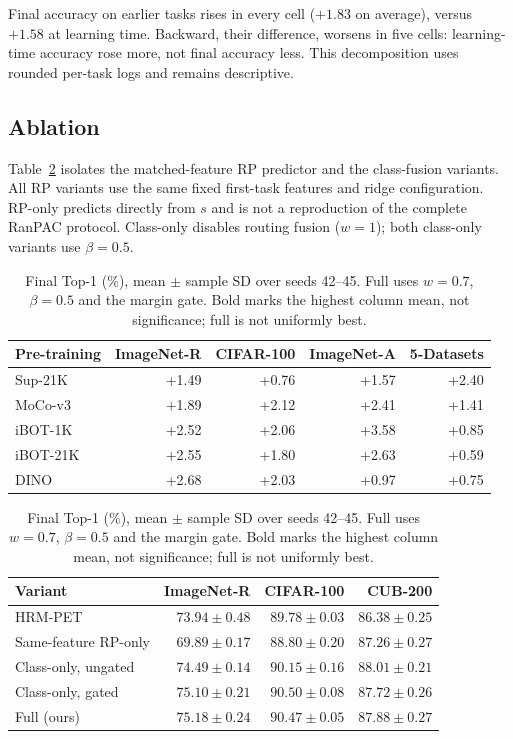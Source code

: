 \documentclass[runningheads]{llncs}
\begin{document}
Final accuracy on earlier tasks rises in every cell ($+1.83$ on
average), versus $+1.58$ at learning time. Backward, their difference, worsens
in five cells: learning-time accuracy rose more, not final accuracy less.
This decomposition uses rounded per-task logs and remains descriptive.

\subsection{Ablation}
\label{sec:ablation}

\noindent\begin{minipage}{\linewidth}
Table~\ref{tab:components} isolates the matched-feature RP predictor and the
class-fusion variants. All RP variants use the same fixed first-task features
and ridge configuration. RP-only predicts directly from $s$ and is not a
reproduction of the complete RanPAC protocol. Class-only disables routing
fusion ($w=1$); both class-only variants use $\beta=0.5$.
\end{minipage}
\par\medskip

\begin{table}[!ht]
\centering
\small
\setlength{\tabcolsep}{6pt}
\caption{Top-1 change (points), full minus matched HRM-PET at seed $42$.
All cells use $w=0.7$, $\beta=0.5$ and the margin gate; no confidence
intervals are implied.}
\label{tab:grid}
\begin{tabular}{lrrrr}
\toprule
Pre-training & ImageNet-R & CIFAR-100 & ImageNet-A & 5-Datasets\\
\midrule
Sup-21K   & +1.49 & +0.76 & +1.57 & +2.40\\
MoCo-v3   & +1.89 & +2.12 & +2.41 & +1.41\\
iBOT-1K   & +2.52 & +2.06 & +3.58 & +0.85\\
iBOT-21K  & +2.55 & +1.80 & +2.63 & +0.59\\
DINO      & +2.68 & +2.03 & +0.97 & +0.75\\
\bottomrule
\end{tabular}

\vspace{.35\baselineskip}
\setlength{\tabcolsep}{5pt}
\caption{Final Top-1 (\%), mean $\pm$ sample SD over seeds 42--45.
Full uses $w=0.7$, $\beta=0.5$ and the margin gate. Bold marks the highest
column mean, not significance; full is not uniformly best.}
\label{tab:components}
\begin{tabular}{lrrr}
\toprule
Variant & ImageNet-R & CIFAR-100 & CUB-200\\
\midrule
HRM-PET & $73.94\pm0.48$ & $89.78\pm0.03$ & $86.38\pm0.25$\\
Same-feature RP-only & $69.89\pm0.17$ & $88.80\pm0.20$ & $87.26\pm0.27$\\
Class-only, ungated & $74.49\pm0.14$ & $90.15\pm0.16$ & $\mathbf{88.01\pm0.21}$\\
Class-only, gated & $75.10\pm0.21$ & $\mathbf{90.50\pm0.08}$ & $87.72\pm0.26$\\
Full (ours) & $\mathbf{75.18\pm0.24}$ & $90.47\pm0.05$ & $87.88\pm0.27$\\
\bottomrule
\end{tabular}
\end{table}
\end{document}
